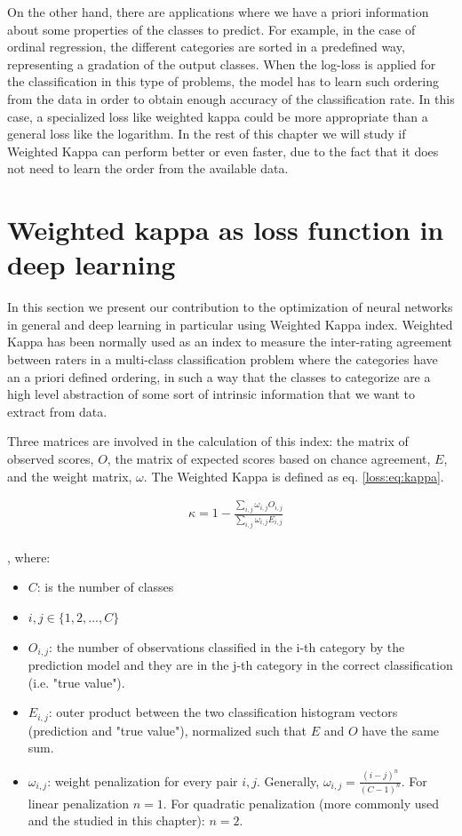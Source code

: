 On the other hand, there are applications where we have a priori information about some properties of the classes to predict. For example, in the case of ordinal regression, the different categories are sorted in a predefined way, representing a gradation of the output classes. When the log-loss is applied for the classification in this type of problems, the model has to learn such ordering from the data in order to obtain enough accuracy of the classification rate. In this case, a specialized loss like weighted kappa could be more appropriate than a general loss like the logarithm. In the rest of this chapter we will study if Weighted Kappa can perform better or even faster, due to the fact that it does not need to learn the order from the available data. 

\section{Weighted kappa as loss function in deep learning}\label{loss:cf}

In this section we present our contribution to the optimization of neural networks in general and deep learning in particular using Weighted Kappa index. Weighted Kappa has been normally used as an index to measure the inter-rating agreement between raters in a multi-class classification problem where the categories have an a priori defined ordering, in such a way that the classes to categorize are a high level abstraction of some sort of intrinsic information that we want to extract from data.

Three matrices are involved in the calculation of this index: the matrix of observed scores, $O$, the matrix of expected scores based on chance agreement, $E$, and the weight matrix, $\omega$. The Weighted Kappa is defined as eq. \ref{loss:eq:kappa}.


\begin{equation}
\label{loss:eq:kappa}
\begin{aligned}
&\kappa = 1 - \frac{ \sum_{i,j} \omega_{i,j} O_{i,j} }
{\sum_{i,j} \omega_{i,j} E_{i,j}}\\
\end{aligned}
\end{equation}

, where:
\begin{itemize}
	\item[] $C$: is the number of classes
	\item[] $i, j \in \{ 1, 2, ..., C\}$
	\item[] $O_{i,j}$: the number of observations classified in the i-th category by the prediction model and they are in the j-th category in the correct classification (i.e. "true value").
	\item[] $E_{i,j}$: outer product between the two classification histogram vectors (prediction and "true value"), normalized such that $E$ and $O$ have the same sum.
	\item[] $\omega_{i,j}$: weight penalization for every pair $i,j$. Generally, $\omega_{i,j} = \frac{(i-j)^n}{(C - 1)^n}$. For linear penalization $n = 1$. For quadratic penalization (more commonly used and the studied in this chapter): $n = 2$.
\end{itemize}

